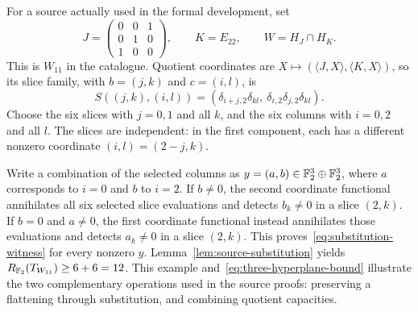 For a source actually used in the formal development, set
\[
 J=\begin{pmatrix}0&0&1\\0&1&0\\1&0&0\end{pmatrix},
 \qquad K=E_{22},\qquad W=H_J\cap H_K.
\]
This is $W_{11}$ in the catalogue. Quotient coordinates are
$X\mapsto(\langle J,X\rangle,\langle K,X\rangle)$, so its slice
family, with $b=(j,k)$ and $c=(i,l)$, is
\begin{equation}\label{eq:source-twelve-slices}
 S((j,k),(i,l))=
    (\delta_{i+j,2}\delta_{kl},\ \delta_{i,2}\delta_{j,2}\delta_{kl}).
\end{equation}
Choose the six slices with $j=0,1$ and all $k$, and the six columns
with $i=0,2$ and all $l$. The slices are independent: in the first
component, each has a different nonzero coordinate $(i,l)=(2-j,k)$.

Write a combination of the selected columns as $y=(a,b)\in\mathbb F_2^3\oplus\mathbb F_2^3$,
where $a$ corresponds to $i=0$ and $b$ to $i=2$.
If $b\ne0$, the second coordinate functional annihilates all six
selected slice evaluations and detects $b_k\ne0$ in a slice $(2,k)$.
If $b=0$ and $a\ne0$, the first coordinate functional instead
annihilates those evaluations and detects $a_k\ne0$ in a slice
$(2,k)$. This proves~\eqref{eq:substitution-witness} for every
nonzero $y$. Lemma~\ref{lem:source-substitution} yields
$R_{\mathbb F_2}(T_{W_{11}})\geq6+6=12$.
This example and~\eqref{eq:three-hyperplane-bound} illustrate the two
complementary operations used in the source proofs: preserving a
flattening through substitution, and combining quotient capacities.
